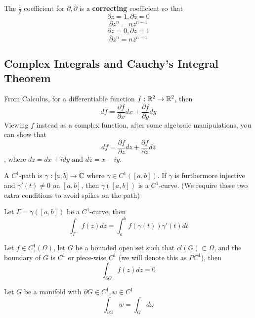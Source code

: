\begin{remark}
    The $\frac{1}{2}$ coefficient for $\partial, \overline{\partial}$ is a \textbf{correcting} coefficient so that
    \[\partial z = 1, \partial \overline{z} = 0\]
    \[\partial z^n = n z^{n-1}\]
    \[\overline{\partial} z = 0, \overline{\partial} \overline{z} = 1\]
    \[\overline{\partial} \overline{z}^n = n \overline{z}^{n-1}\]
\end{remark}

\subsection{Complex Integrals and Cauchy's Integral Theorem}

From Calculus, for a differentiable function $f: \mathbb{R}^2 \to \mathbb{R}^2$, then
\[df = \frac{\partial f}{\partial x} dx + \frac{\partial f}{\partial y} dy\]
Viewing $f$ instead as a complex function, after some algebraic manipulations, you can show that
\[df = \frac{\partial f}{\partial z} dz + \frac{\partial f}{\partial \overline{z}} d\overline{z}\]
, where $dz = dx + idy$ and $d\overline{z} = x - iy$.

\begin{definition}
A $C^1$-path is $\gamma: [a, b] \to \mathbb{C}$ where $\gamma \in C^1([a, b])$. If $\gamma$ is furthermore injective and $\gamma'(t) \neq 0$ on $[a, b]$, then $\gamma([a, b])$ is a $C^1$-curve. (We require these two extra conditions to avoid spikes on the path)
\end{definition}

\begin{definition}
Let $\Gamma = \gamma([a, b])$ be a $C^1$-curve, then
\[\int_\Gamma f(z) dz = \int_a^b f(\gamma(t)) \gamma'(t) dt\]
\end{definition}

\begin{theorem}
Let $f \in C^1_z(\Omega)$, let $G$ be a bounded open set such that $cl(G) \subset \Omega$, and the boundary of $G$ is $C^1$ or piece-wise $C^1$ (we will denote this as $PC^1$), then
\[\int_{\partial G} f(z) dz = 0\]
\end{theorem}

\begin{theorem}
Let $G$ be a manifold with $\partial G \in C^1, w \in C^1$
\[\int_{\partial G} w = \int_G d \omega\]
\end{theorem}

